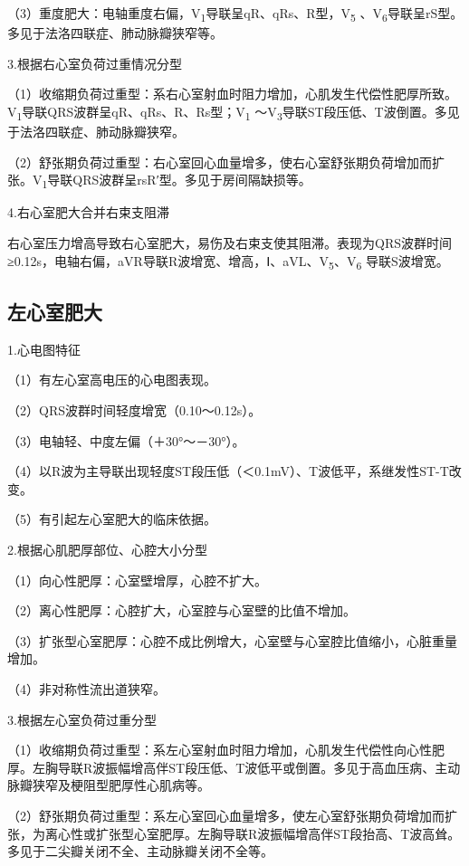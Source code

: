 （3）重度肥大：电轴重度右偏，V\textsubscript{1}导联呈qR、qRs、R型，V\textsubscript{5} 、V\textsubscript{6}导联呈rS型。多见于法洛四联症、肺动脉瓣狭窄等。

3.根据右心室负荷过重情况分型

（1）收缩期负荷过重型：系右心室射血时阻力增加，心肌发生代偿性肥厚所致。V\textsubscript{1}导联QRS波群呈qR、qRs、R、Rs型；V\textsubscript{1} ～V\textsubscript{3}导联ST段压低、T波倒置。多见于法洛四联症、肺动脉瓣狭窄。

（2）舒张期负荷过重型：右心室回心血量增多，使右心室舒张期负荷增加而扩张。V\textsubscript{1}导联QRS波群呈rsR′型。多见于房间隔缺损等。

4.右心室肥大合并右束支阻滞

右心室压力增高导致右心室肥大，易伤及右束支使其阻滞。表现为QRS波群时间≥0.12s，电轴右偏，aVR导联R波增宽、增高，Ⅰ、aVL、V\textsubscript{5}、V\textsubscript{6} 导联S波增宽。

\protect\hypertarget{text00009.htmlux5cux23subid42}{}{}

\subsection{左心室肥大}

1.心电图特征

（1）有左心室高电压的心电图表现。

（2）QRS波群时间轻度增宽（0.10～0.12s）。

（3）电轴轻、中度左偏（＋30°～－30°）。

（4）以R波为主导联出现轻度ST段压低（＜0.1mV）、T波低平，系继发性ST-T改变。

（5）有引起左心室肥大的临床依据。

2.根据心肌肥厚部位、心腔大小分型

（1）向心性肥厚：心室壁增厚，心腔不扩大。

（2）离心性肥厚：心腔扩大，心室腔与心室壁的比值不增加。

（3）扩张型心室肥厚：心腔不成比例增大，心室壁与心室腔比值缩小，心脏重量增加。

（4）非对称性流出道狭窄。

3.根据左心室负荷过重分型

（1）收缩期负荷过重型：系左心室射血时阻力增加，心肌发生代偿性向心性肥厚。左胸导联R波振幅增高伴ST段压低、T波低平或倒置。多见于高血压病、主动脉瓣狭窄及梗阻型肥厚性心肌病等。

（2）舒张期负荷过重型：系左心室回心血量增多，使左心室舒张期负荷增加而扩张，为离心性或扩张型心室肥厚。左胸导联R波振幅增高伴ST段抬高、T波高耸。多见于二尖瓣关闭不全、主动脉瓣关闭不全等。

